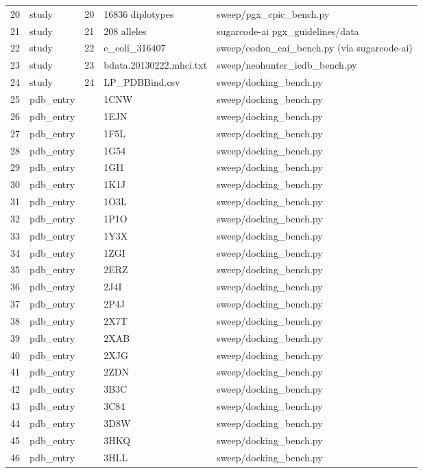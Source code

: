 {\begin{longtable}{rllp{3.2cm}p{4.2cm}}
20 & study & 20 & 16836 diplotypes & sweep/pgx\_cpic\_bench.py\\
21 & study & 21 & 208 alleles & sugarcode-ai pgx\_guidelines/data\\
22 & study & 22 & e\_coli\_316407 & sweep/codon\_cai\_bench.py (via sugarcode-ai)\\
23 & study & 23 & bdata.20130222.mhci.txt & sweep/neohunter\_iedb\_bench.py\\
24 & study & 24 & LP\_PDBBind.csv & sweep/docking\_bench.py\\
25 & pdb\_entry &  & 1CNW & sweep/docking\_bench.py\\
26 & pdb\_entry &  & 1EJN & sweep/docking\_bench.py\\
27 & pdb\_entry &  & 1F5L & sweep/docking\_bench.py\\
28 & pdb\_entry &  & 1G54 & sweep/docking\_bench.py\\
29 & pdb\_entry &  & 1GI1 & sweep/docking\_bench.py\\
30 & pdb\_entry &  & 1K1J & sweep/docking\_bench.py\\
31 & pdb\_entry &  & 1O3L & sweep/docking\_bench.py\\
32 & pdb\_entry &  & 1P1O & sweep/docking\_bench.py\\
33 & pdb\_entry &  & 1Y3X & sweep/docking\_bench.py\\
34 & pdb\_entry &  & 1ZGI & sweep/docking\_bench.py\\
35 & pdb\_entry &  & 2ERZ & sweep/docking\_bench.py\\
36 & pdb\_entry &  & 2J4I & sweep/docking\_bench.py\\
37 & pdb\_entry &  & 2P4J & sweep/docking\_bench.py\\
38 & pdb\_entry &  & 2X7T & sweep/docking\_bench.py\\
39 & pdb\_entry &  & 2XAB & sweep/docking\_bench.py\\
40 & pdb\_entry &  & 2XJG & sweep/docking\_bench.py\\
41 & pdb\_entry &  & 2ZDN & sweep/docking\_bench.py\\
42 & pdb\_entry &  & 3B3C & sweep/docking\_bench.py\\
43 & pdb\_entry &  & 3C84 & sweep/docking\_bench.py\\
44 & pdb\_entry &  & 3D8W & sweep/docking\_bench.py\\
45 & pdb\_entry &  & 3HKQ & sweep/docking\_bench.py\\
46 & pdb\_entry &  & 3HLL & sweep/docking\_bench.py\\

\end{longtable}}

